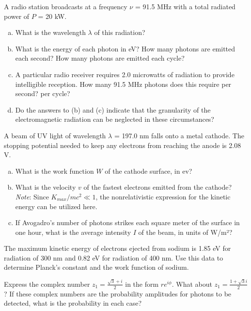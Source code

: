 \documentclass[12pt,letterpaper]{hmcpset}
\begin{document}
	\begin{problem}[T1.4:]
		A radio station broadcasts at a frequency $\nu$ = 91.5 MHz with a total radiated power of $P$ = 20 kW.
		\begin{enumerate}[(a)]
			\item What is the wavelength $\lambda$ of this radiation?
			\item What is the energy of each photon in eV? How many photons are emitted each second? How many photons are emitted each cycle?
			\item A particular radio receiver requires 2.0 microwatts of radiation to provide intelligible reception. How many 91.5 MHz photons does this require per second? per cycle?
			\item Do the answers to (b) and (c) indicate that the granularity of the electromagnetic radiation can be neglected in these circumstances?
		\end{enumerate}
	\end{problem}
	\clearpage



	\begin{problem}[T1.9:]
		A beam of UV light of wavelength $\lambda$ = 197.0 nm falls onto a metal cathode. The stopping potential needed to keep any electrons from reaching the anode is 2.08 V.
		\begin{enumerate}[(a)]
			\item What is the work function $W$ of the cathode surface, in ev?
			\item What is the velocity $v$ of the fastest electrons emitted from the cathode? \textit{Note}: Since $K_{max}/mc^2 \ll 1$, the nonrelativistic expression for the kinetic energy can be utilized here.
			\item If Avogadro's number of photons strikes each square meter of the surface in one hour, what is the average intensity $I$ of the beam, in units of W/m²?
		\end{enumerate}
	\end{problem}
	\clearpage



	\begin{problem}[T1.13:]
		The maximum kinetic energy of electrons ejected from sodium is 1.85 eV for radiation of 300 nm and 0.82 eV for radiation of 400 nm. Use this data to determine Planck's constant and the work function of sodium.
	\end{problem}
	\clearpage



	\begin{problem}[T1.19:]
		Express the complex number $z_1 = \frac{\sqrt{3} + i}{2}$ in the form $re^{i\phi}$. What about $z_1 = \frac{1 + \sqrt{3}i}{2}$?
		If these complex numbers are the probability amplitudes for photons to be detected, what is the probability in each case?
	\end{problem}
	\clearpage
\end{document}
